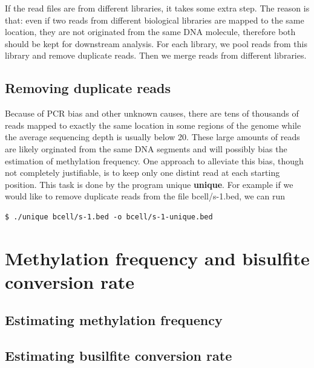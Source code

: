 \documentclass{article}
\begin{document}
If the read files are from different libraries, it takes some extra
step. The reason is that: even if two reads from different biological
libraries are mapped to the same location, they are not originated
from the same DNA molecule, therefore both should be kept for
downstream analysis. For each library, we pool reads from this library
and remove duplicate reads. Then we merge reads from different
libraries. 

\subsection{Removing duplicate reads}
\label{sec:proc-dupl-reads}
Because of PCR bias and other unknown causes, there are tens of
thousands of reads mapped to exactly the same location in some regions
of the genome while the average sequencing depth is usually below
20. These large amounts of reads are likely orginated from the same
DNA segments and will possibly bias the estimation of methylation
frequency. One approach to alleviate this bias, though not completely
justifiable, is to keep only one distint read at each starting
position. This task is done by the program unique \textbf{unique}. For
example if we would like to remove duplicate reads from the file
bcell/s-1.bed, we can run 
\begin{verbatim}
$ ./unique bcell/s-1.bed -o bcell/s-1-unique.bed
\end{verbatim}

\section{Methylation frequency and bisulfite conversion rate}
\label{sec:estim-methyl-freq}

\subsection{Estimating methylation frequency}
\label{sec:estim-methyl-freq}

\subsection{Estimating busilfite conversion rate}
\label{sec:estim-busilf-conv}
\end{document}

